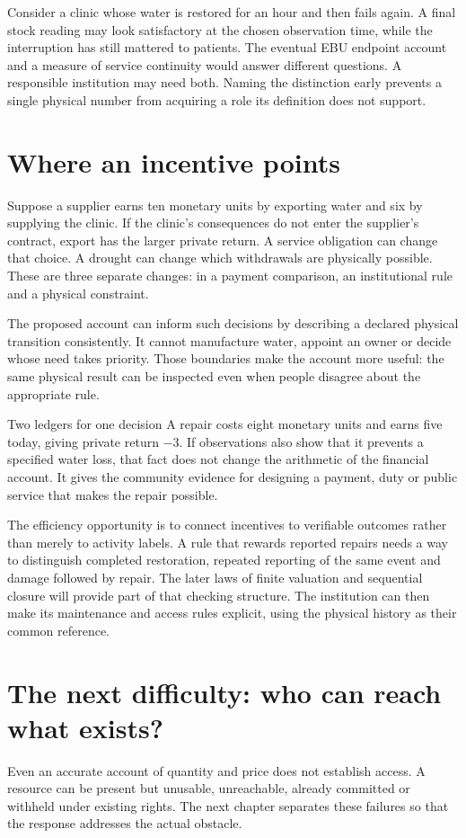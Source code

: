 Consider a clinic whose water is restored for an hour and then fails again. A final stock reading may look satisfactory at the chosen observation time, while the interruption has still mattered to patients. The eventual EBU endpoint account and a measure of service continuity would answer different questions. A responsible institution may need both. Naming the distinction early prevents a single physical number from acquiring a role its definition does not support.

\section{Where an incentive points}
Suppose a supplier earns ten monetary units by exporting water and six by supplying the clinic. If the clinic's consequences do not enter the supplier's contract, export has the larger private return. A service obligation can change that choice. A drought can change which withdrawals are physically possible. These are three separate changes: in a payment comparison, an institutional rule and a physical constraint.

The proposed account can inform such decisions by describing a declared physical transition consistently. It cannot manufacture water, appoint an owner or decide whose need takes priority. Those boundaries make the account more useful: the same physical result can be inspected even when people disagree about the appropriate rule.

\begin{workedbox}{Two ledgers for one decision}
A repair costs eight monetary units and earns five today, giving private return $-3$. If observations also show that it prevents a specified water loss, that fact does not change the arithmetic of the financial account. It gives the community evidence for designing a payment, duty or public service that makes the repair possible.
\end{workedbox}

The efficiency opportunity is to connect incentives to verifiable outcomes rather than merely to activity labels. A rule that rewards reported repairs needs a way to distinguish completed restoration, repeated reporting of the same event and damage followed by repair. The later laws of finite valuation and sequential closure will provide part of that checking structure. The institution can then make its maintenance and access rules explicit, using the physical history as their common reference.

\section{The next difficulty: who can reach what exists?}
Even an accurate account of quantity and price does not establish access. A resource can be present but unusable, unreachable, already committed or withheld under existing rights. The next chapter separates these failures so that the response addresses the actual obstacle.
